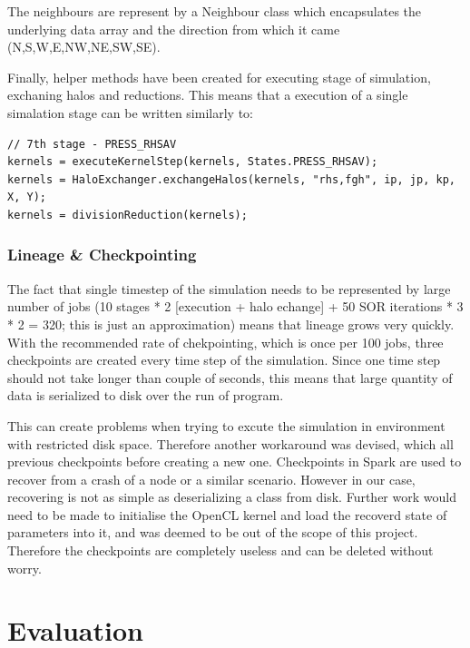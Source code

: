\documentclass{l4proj}
\begin{document}
The neighbours are represent by a Neighbour class which encapsulates the underlying data
array and the direction from which it came (N,S,W,E,NW,NE,SW,SE).

Finally, helper methods have been created for executing stage of simulation, exchaning halos
and reductions. This means that a execution of a single simalation stage can be written similarly to:

\begin{lstlisting}
// 7th stage - PRESS_RHSAV
kernels = executeKernelStep(kernels, States.PRESS_RHSAV);
kernels = HaloExchanger.exchangeHalos(kernels, "rhs,fgh", ip, jp, kp, X, Y);
kernels = divisionReduction(kernels);
\end{lstlisting}

\subsection{Lineage \& Checkpointing}

The fact that single timestep of the simulation needs to be represented by
large number of jobs (10 stages * 2 [execution + halo echange] + 50 SOR iterations * 3
* 2 = 320; this is just an approximation) means that lineage grows very quickly.
With the recommended rate of chekpointing, which is once per 100 jobs, three 
checkpoints are created every time step of the simulation. Since one time step
should not take longer than couple of seconds, this means that large quantity 
of data is serialized to disk over the run of program.

This can create problems when trying to excute the simulation in environment
with restricted disk space. Therefore another workaround was devised, which 
all previous checkpoints before creating a new one. Checkpoints in Spark are used
to recover from a crash of a node or a similar scenario. However in our case,
recovering is not as simple as deserializing a class from disk. Further work
would need to be made to initialise the OpenCL kernel and load the recoverd state 
of parameters into it, and was deemed to be out of the scope of this project.
Therefore the checkpoints are completely useless and can be deleted without worry.

\chapter{Evaluation}
\label{chap:eval}
\end{document}
